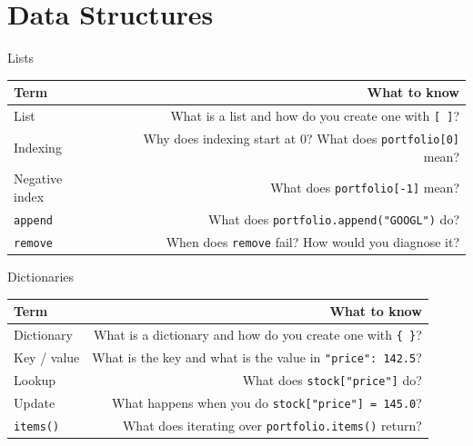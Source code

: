 \documentclass[9pt,aspectratio=169]{beamer}
\begin{document}
\section{Data Structures}

\begin{frame}{Lists}

\begin{tabular}{@{}lR@{}}
\toprule
\textbf{Term} & \textbf{What to know} \\
\midrule
\alert{List} & What is a list and how do you create one with \texttt{[~]}? \\[0.8em]
\alert{Indexing} & Why does indexing start at 0? What does \texttt{portfolio[0]} mean? \\[0.8em]
\alert{Negative index} & What does \texttt{portfolio[-1]} mean? \\[0.8em]
\alert{\texttt{append}} & What does \texttt{portfolio.append("GOOGL")} do? \\[0.8em]
\alert{\texttt{remove}} & When does \texttt{remove} fail? How would you diagnose it? \\
\bottomrule
\end{tabular}

\end{frame}


\begin{frame}{Dictionaries}

\begin{tabular}{@{}lR@{}}
\toprule
\textbf{Term} & \textbf{What to know} \\
\midrule
\alert{Dictionary} & What is a dictionary and how do you create one with \texttt{\{~\}}? \\[0.8em]
\alert{Key / value} & What is the key and what is the value in \texttt{"price": 142.5}? \\[0.8em]
\alert{Lookup} & What does \texttt{stock["price"]} do? \\[0.8em]
\alert{Update} & What happens when you do \texttt{stock["price"] = 145.0}? \\[0.8em]
\alert{\texttt{items()}} & What does iterating over \texttt{portfolio.items()} return? \\
\bottomrule
\end{tabular}

\end{frame}
\end{document}
